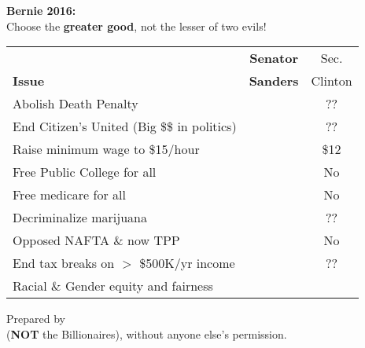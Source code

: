 \newcommand{\checkbox}{\makebox[0pt][l]{$\square$}\raisebox{.15ex}{\hspace{0.1em}$\checkmark$}}
\setlength{\baselineskip}{8.25pt}
\vspace{-11pt}

\begin{center}
  {\Huge\bf Bernie 2016:}\\

  {\small Choose the {\bf greater good}, not the lesser of two evils!}\\[5pt]

  \begin{tabular}{l|@{\hskip 1pt}c@{\hskip 1pt}|@{\hskip 1pt}c}
\setlength{\tabcolsep}{0pt}
                  & {\bf\small Senator} & Sec.      \\
\bf Issue         & {\bf\small Sanders} & Clinton \\
\hline
Abolish Death Penalty                        & \checkbox &      ??      \\
End Citizen's United (Big \$\$ in politics)  & \checkbox &	??	\\
Raise minimum wage to \$15/hour              & \checkbox &	\$12	\\
Free Public College for all                  & \checkbox &	No	\\
Free medicare for all                        & \checkbox &	No	\\
Decriminalize marijuana                      & \checkbox &	??	\\
Opposed NAFTA \& now TPP                     & \checkbox &	No	\\
End tax breaks on $>$ \$500K/yr income       & \checkbox &	??	\\
Racial \& Gender equity and fairness         & \checkbox & \checkbox    \\

  \end{tabular}
\vspace{-9pt}
\begin{framed}
\small Prepared by \GroupName\\
({\bf NOT} the Billionaires), without anyone else's permission.\\
{\tt \GroupURL}
\end{framed}
\end{center}
\vspace{-18pt}
